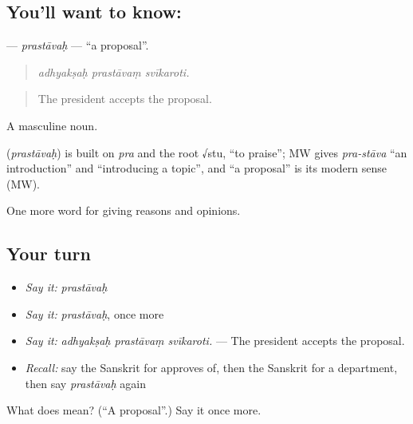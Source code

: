 \subsection*{You'll want to know: }
\textbf{} — \emph{prastāvaḥ} — \textquotedblleft{}a proposal\textquotedblright{}.

\begin{quote}
  
\end{quote}

\begin{quote}
\emph{adhyakṣaḥ prastāvaṃ svīkaroti.}
\end{quote}

\begin{quote}
The president accepts the proposal.
\end{quote}

A masculine noun.

\begin{cousinweb}
\textbf{} (\emph{prastāvaḥ}) is built on \emph{pra} and the root √stu, \textquotedblleft{}to praise\textquotedblright{}; MW gives \emph{pra-stāva} \textquotedblleft{}an introduction\textquotedblright{} and \textquotedblleft{}introducing a topic\textquotedblright{}, and \textquotedblleft{}a proposal\textquotedblright{} is its modern sense (MW).
\end{cousinweb}

\begin{grammarlens}[title={What you've built}]
One more word for giving reasons and opinions.
\end{grammarlens}

\subsection*{Your turn}
\begin{itemize}
\raggedright
  \item \emph{Say it:} \emph{prastāvaḥ}
  \item \emph{Say it:} \emph{prastāvaḥ}, once more
  \item \emph{Say it:} \emph{adhyakṣaḥ prastāvaṃ svīkaroti.} — The president accepts the proposal.
  \item \emph{Recall:} say the Sanskrit for approves of, then the Sanskrit for a department, then say \emph{prastāvaḥ} again
\end{itemize}

\begin{tcolorbox}[breakable,colback=teal!4,colframe=teal!35!black,title={Before you move on}]
What does  mean? (\textquotedblleft{}A proposal\textquotedblright{}.) Say it once more.
\end{tcolorbox}
